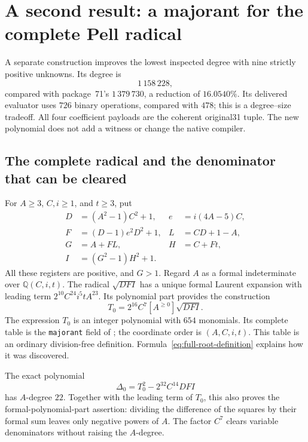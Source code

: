 \section{A second result: a majorant for the complete Pell radical}
\label{sec:full-radical}

A separate construction improves the lowest inspected degree with nine
strictly positive unknowns. Its degree is
\[
 \boxed{1\,158\,228},
\]
compared with package~71's $1\,379\,730$, a reduction of $16.0540\%$.
Its delivered evaluator uses $726$ binary operations, compared with $478$;
this is a degree--size tradeoff. All four coefficient payloads are the
coherent original31 tuple. The new polynomial does not add a witness or
change the native compiler.

\subsection{The complete radical and the denominator that can be cleared}

For $A\ge3$, $C,i\ge1$, and $t\ge3$, put
\begin{align*}
 D&=(A^2-1)C^2+1,& e&=i(4A-5)C,\\
 F&=(D-1)e^2D^2+1,& L&=CD+1-A,\\
 G&=A+FL,& H&=C+Ft,\\
 I&=(G^2-1)H^2+1.
\end{align*}
All these registers are positive, and $G>1$. Regard $A$ as a formal
indeterminate over $\mathbb Q(C,i,t)$. The radical $\sqrt{DFI}$ has a unique
formal Laurent expansion with leading term
$2^{10}C^{24}i^5tA^{23}$. Its polynomial part provides the construction
\begin{equation}
 T_0=2^{16}C^7[A^{\ge0}]\sqrt{DFI}.
 \label{eq:full-root-definition}
\end{equation}
The expression $T_0$ is an integer polynomial with $654$ monomials. Its
complete table is the \texttt{majorant} field of
; the coordinate order is
$(A,C,i,t)$. This table is an ordinary division-free definition.
Formula~\eqref{eq:full-root-definition} explains how it was discovered.

The exact polynomial
\begin{equation}
 \Delta_0=T_0^2-2^{32}C^{14}DFI
 \label{eq:full-root-defect}
\end{equation}
has $A$-degree $22$. Together with the leading term of $T_0$, this also
proves the formal-polynomial-part assertion: dividing the difference of
the squares by their formal sum leaves only negative powers of $A$.
The factor $C^7$ clears variable denominators without raising the
$A$-degree.

